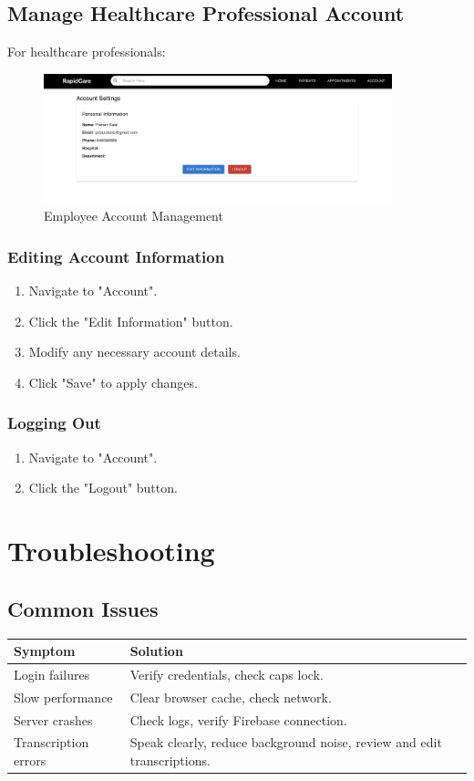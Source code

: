 \documentclass[12pt, titlepage]{article}
\begin{document}
\subsection{Manage Healthcare Professional Account}
For healthcare professionals:

\begin{figure}[H]
\centering
\includegraphics[width=0.9\textwidth]{employee_account.png}
\caption{Employee Account Management}
\label{fig:Employee Account Management}
\end{figure}

\subsubsection{Editing Account Information}
\begin{enumerate}
    \item Navigate to "Account".
    \item Click the "Edit Information" button.
    \item Modify any necessary account details.
    \item Click "Save" to apply changes.
\end{enumerate}

\subsubsection{Logging Out}
\begin{enumerate}
    \item Navigate to "Account".
    \item Click the "Logout" button.
\end{enumerate}


\section{Troubleshooting}
\subsection{Common Issues}
\begin{longtable}{p{}p{}}
\toprule
\textbf{Symptom} & \textbf{Solution} \\
\midrule
Login failures & Verify credentials, check caps lock. \\
Slow performance & Clear browser cache, check network. \\
Server crashes & Check logs, verify Firebase connection. \\
Transcription errors & Speak clearly, reduce background noise, review and edit transcriptions. \\
\bottomrule
\end{longtable}
\end{document}
